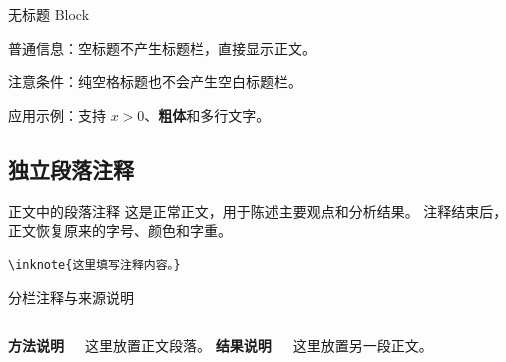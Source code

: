 \begin{frame}{无标题 Block}
  \begin{block}{}
    普通信息：空标题不产生标题栏，直接显示正文。
  \end{block}
  \begin{alertblock}{   }
    注意条件：纯空格标题也不会产生空白标题栏。
  \end{alertblock}
  \begin{exampleblock}{}
    应用示例：支持 $x>0$、\textbf{粗体}和多行文字。
  \end{exampleblock}
\end{frame}

\subsection{独立段落注释}
\begin{frame}[fragile]{正文中的段落注释}
  这是正常正文，用于陈述主要观点和分析结果。
  注释结束后，正文恢复原来的字号、颜色和字重。
  \begin{verbatim}
\inknote{这里填写注释内容。}
  \end{verbatim}
\end{frame}

\begin{frame}{分栏注释与来源说明}
  \begin{columns}[T,onlytextwidth]
      \textbf{方法说明}\par\smallskip
      这里放置正文段落。
      \textbf{结果说明}\par\smallskip
      这里放置另一段正文。
  \end{columns}
\end{frame}
